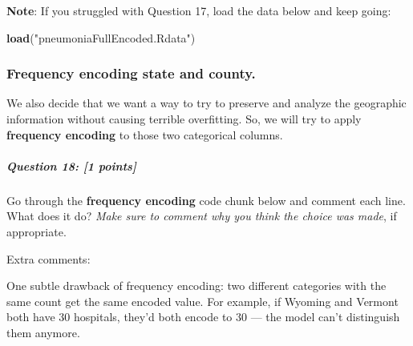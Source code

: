 \documentclass[
]{article}
\newenvironment{Shaded}{\begin{snugshade}}{\end{snugshade}}
\newcommand{\FunctionTok}[1]{\textcolor[rgb]{0.13,0.29,0.53}{\textbf{#1}}}
\newcommand{\NormalTok}[1]{#1}
\newcommand{\StringTok}[1]{\textcolor[rgb]{0.31,0.60,0.02}{#1}}
\begin{document}
\textbf{Note}: If you struggled with Question 17, load the data below
and keep going:

\begin{Shaded}
\begin{Highlighting}[]
\FunctionTok{load}\NormalTok{(}\StringTok{"pneumoniaFullEncoded.Rdata"}\NormalTok{)}
\end{Highlighting}
\end{Shaded}

\subsubsection{Frequency encoding state and
county.}\label{frequency-encoding-state-and-county.}

We also decide that we want a way to try to preserve and analyze the
geographic information without causing terrible overfitting. So, we will
try to apply \textbf{frequency encoding} to those two categorical
columns.

\subparagraph{\texorpdfstring{\textbf{Question 18}: {[}1
points{]}}{Question 18: {[}1 points{]}}}\label{question-18-1-points}

Go through the \textbf{frequency encoding} code chunk below and comment
each line. What does it do? \emph{Make sure to comment why you think the
choice was made}, if appropriate.

Extra comments:

One subtle drawback of frequency encoding: two different categories with
the same count get the same encoded value. For example, if Wyoming and
Vermont both have 30 hospitals, they'd both encode to 30 --- the model
can't distinguish them anymore.
\end{document}

